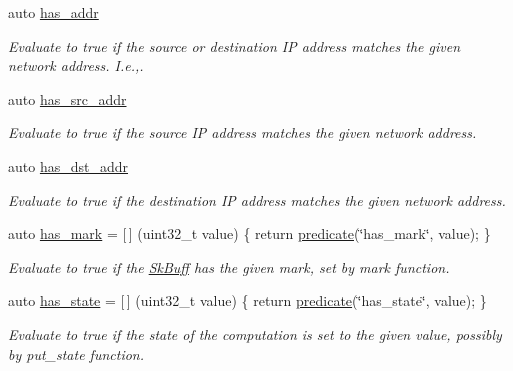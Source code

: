 \begin{DoxyCompactItemize}
auto \hyperlink{namespacepfq_1_1lang_1_1anonymous__namespace_02default_8hpp_03_a74c6b7e812fb3d312ebf534960a6a91d}{has\+\_\+addr}
\begin{DoxyCompactList}\small\item\em Evaluate to {\ttfamily true} if the source or destination IP address matches the given network address. I.\+e.,. \end{DoxyCompactList}\item 
auto \hyperlink{namespacepfq_1_1lang_1_1anonymous__namespace_02default_8hpp_03_acb03dd3e34d6dd7e83d621fa9077194c}{has\+\_\+src\+\_\+addr}
\begin{DoxyCompactList}\small\item\em Evaluate to {\ttfamily true} if the source IP address matches the given network address. \end{DoxyCompactList}\item 
auto \hyperlink{namespacepfq_1_1lang_1_1anonymous__namespace_02default_8hpp_03_a0a53822af0ed8ea341f16a1da5ea83e3}{has\+\_\+dst\+\_\+addr}
\begin{DoxyCompactList}\small\item\em Evaluate to {\ttfamily true} if the destination IP address matches the given network address. \end{DoxyCompactList}\item 
auto \hyperlink{namespacepfq_1_1lang_1_1anonymous__namespace_02default_8hpp_03_aa4ce1fdb0d99e1ca0afdf76619c58d12}{has\+\_\+mark} = \mbox{[}$\,$\mbox{]} (uint32\+\_\+t value) \{ return \hyperlink{namespacepfq_1_1lang_aca9adafc436b7f851621b979fa1aaf88}{predicate}(\char`\"{}has\+\_\+mark\char`\"{}, value); \}
\begin{DoxyCompactList}\small\item\em Evaluate to {\ttfamily true} if the \hyperlink{structpfq_1_1lang_1_1SkBuff}{Sk\+Buff} has the given {\ttfamily mark}, set by mark function. \end{DoxyCompactList}\item 
auto \hyperlink{namespacepfq_1_1lang_1_1anonymous__namespace_02default_8hpp_03_a8efacc41a17e01f17a25e8fc1d784c74}{has\+\_\+state} = \mbox{[}$\,$\mbox{]} (uint32\+\_\+t value) \{ return \hyperlink{namespacepfq_1_1lang_aca9adafc436b7f851621b979fa1aaf88}{predicate}(\char`\"{}has\+\_\+state\char`\"{}, value); \}
\begin{DoxyCompactList}\small\item\em Evaluate to {\ttfamily true} if the state of the computation is set to the given {\ttfamily value}, possibly by put\+\_\+state function. \end{DoxyCompactList}\item 

\end{DoxyCompactItemize}

